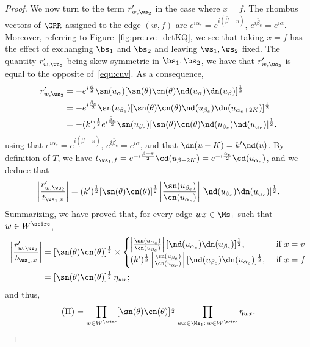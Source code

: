\documentclass[a4paper,twoside,11pt]{article}
\begin{document}
\begin{proof}
We now turn to the term $r'_{w,\ws_2}$ in the case where $x=f$.
The rhombus vectors of $\GRR$
assigned to the edge $(w,f)$ are $e^{i\bar{\alpha}_e}=e^{i(\bar{\beta}-\pi)}$, $e^{i\bar{\beta}_e}=e^{i\bar{\alpha}}$. Moreover,
referring to Figure~\ref{fig:preuve_detKQ}, we see that taking $x=f$ has the effect of exchanging $\bs_1$ and
$\bs_2$ and leaving $\ws_1,\ws_2$ fixed. The quantity $r'_{w,\ws_2}$ being skew-symmetric in $\bs_1,\bs_2$, we have that $r'_{w,\ws_2}$ is equal 
to the opposite of~\eqref{equ:cuv}. As a consequence,
\begin{align*}
r'_{w,\ws_2}&=-e^{i\frac{\bar{\alpha}}{2}}\sn(u_\alpha)[\sn(\theta)\cn(\theta)\nd(u_\alpha)\dn(u_\beta)]^{\frac{1}{2}}\nonumber\\
&=-e^{i\frac{\bar{\beta}_e}{2}}\sn(u_{\beta_e})[\sn(\theta)\cn(\theta)\nd(u_{\beta_e})\dn(u_{\alpha_e+2K})]^{\frac{1}{2}}
\nonumber\\
&=-(k')^{\frac{1}{2}}e^{i\frac{\bar{\beta}_e}{2}}\sn(u_{\beta_e})[\sn(\theta)\cn(\theta)\nd(u_{\beta_e})\nd(u_{\alpha_e})]^{\frac{1}{2}}.
\end{align*}
using that $e^{i\bar{\alpha}_e}=e^{i(\bar{\beta}-\pi)}$, $e^{i\bar{\beta}_e}=e^{i\bar{\alpha}}$, and that $\dn(u-K)=k'\nd(u)$.
By definition of $T$, we have $t_{\ws_1,f}=e^{-i\frac{\bar{\beta}-\pi}{2}}\cd(u_{\beta-2K})=e^{-i\frac{\bar{\alpha}_e}{2}}\cd(u_{\alpha_e})$,
and we deduce that
\begin{equation*}
\left|\frac{r'_{w,\ws_2}}{t_{\ws_1,v}}\right|=(k')^{\frac{1}{2}}[\sn(\theta)\cn(\theta)]^\frac{1}{2}
\left|\frac{\sn(u_{\beta_e})}{\cn(u_{\alpha_e})}\right|[\nd(u_{\beta_e})\dn(u_{\alpha_e})]^{\frac{1}{2}}.
\end{equation*}
Summarizing, we have proved that, for every edge $wx\in\Ms_1$ such that $w\in W^\scirc$,
\begin{align*}
\left|\frac{r'_{w,\ws_2}}{t_{\ws_1,x}}\right|&=
[\sn(\theta)\cn(\theta)]^{\frac{1}{2}}\times
\begin{cases}
\left|\frac{\sn(u_{\alpha_e})}{\cn(u_{\beta_e})}\right|[\nd(u_{\alpha_e})\dn(u_{\beta_e})]^{\frac{1}{2}},&\text{ if $x=v$}\\
(k')^{\frac{1}{2}}\left|\frac{\sn(u_{\beta_e})}{\cn(u_{\alpha_e})}\right|[\nd(u_{\beta_e})\dn(u_{\alpha_e})]^{\frac{1}{2}},&\text{ if $x=f$}
\end{cases}\\
&=[\sn(\theta)\cn(\theta)]^{\frac{1}{2}}\,\eta_{wx};
\end{align*}
and thus,
\begin{equation}\label{equ:II}
\mathrm{(II)}=\prod_{w\in W^\scirc}[\sn(\theta)\cn(\theta)]^{\frac{1}{2}}\prod_{wx\in \Ms_1:\,w\in W^\scirc}\eta_{wx}. 
\end{equation}



\end{proof}
\end{document}
